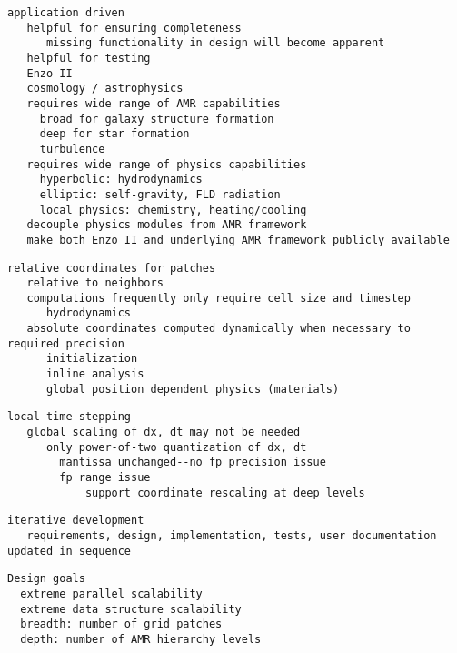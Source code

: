\documentclass[14pt,letter]{article}
\begin{document}
\begin{verbatim}
application driven
   helpful for ensuring completeness
      missing functionality in design will become apparent
   helpful for testing
   Enzo II
   cosmology / astrophysics
   requires wide range of AMR capabilities
     broad for galaxy structure formation
     deep for star formation
     turbulence
   requires wide range of physics capabilities
     hyperbolic: hydrodynamics
     elliptic: self-gravity, FLD radiation
     local physics: chemistry, heating/cooling
   decouple physics modules from AMR framework
   make both Enzo II and underlying AMR framework publicly available
\end{verbatim}

\begin{verbatim}
relative coordinates for patches   
   relative to neighbors
   computations frequently only require cell size and timestep
      hydrodynamics
   absolute coordinates computed dynamically when necessary to required precision
      initialization
      inline analysis
      global position dependent physics (materials)
\end{verbatim}

\begin{verbatim}
local time-stepping
   global scaling of dx, dt may not be needed
      only power-of-two quantization of dx, dt
        mantissa unchanged--no fp precision issue
        fp range issue
            support coordinate rescaling at deep levels
\end{verbatim}

\begin{verbatim}
iterative development
   requirements, design, implementation, tests, user documentation updated in sequence
\end{verbatim}

\begin{verbatim}
Design goals
  extreme parallel scalability
  extreme data structure scalability
  breadth: number of grid patches
  depth: number of AMR hierarchy levels
\end{verbatim}
\end{document}
